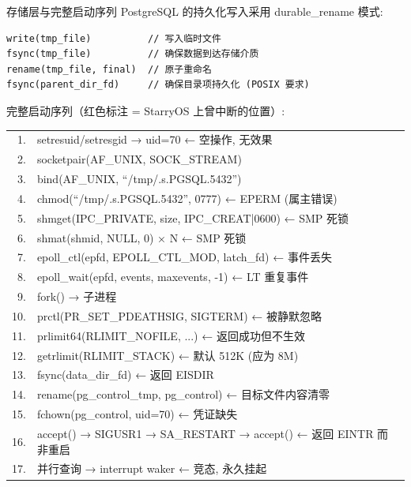 \documentclass[aspectratio=169,10pt]{ctexbeamer}
\newcommand{\highlight}[1]{\textcolor{accent}{#1}}
\newcommand{\warn}[1]{\textcolor{warn}{#1}}
\begin{document}
\begin{frame}[fragile,shrink=50]{存储层与完整启动序列}
\tiny
PostgreSQL 的持久化写入采用 \highlight{durable\_rename} 模式:

\begin{verbatim}
write(tmp_file)          // 写入临时文件
fsync(tmp_file)          // 确保数据到达存储介质
rename(tmp_file, final)  // 原子重命名
fsync(parent_dir_fd)     // 确保目录项持久化 (POSIX 要求)
\end{verbatim}

\vspace{1mm}
完整启动序列（\warn{红色标注} = StarryOS 上曾中断的位置）:

{\footnotesize
\begin{tabular}{r l}
 1. & setresuid/setresgid → uid=70
        \warn{← 空操作, 无效果} \\
 2. & socketpair(AF\_UNIX, SOCK\_STREAM) \\
 3. & bind(AF\_UNIX, ``/tmp/.s.PGSQL.5432'') \\
 4. & chmod(``/tmp/.s.PGSQL.5432'', 0777)
        \warn{← EPERM (属主错误)} \\
 5. & shmget(IPC\_PRIVATE, size, IPC\_CREAT|0600)
        \warn{← SMP 死锁} \\
 6. & shmat(shmid, NULL, 0) × N
        \warn{← SMP 死锁} \\
 7. & epoll\_ctl(epfd, EPOLL\_CTL\_MOD, latch\_fd)
        \warn{← 事件丢失} \\
 8. & epoll\_wait(epfd, events, maxevents, -1)
        \warn{← LT 重复事件} \\
 9. & fork() → 子进程 \\
10. & prctl(PR\_SET\_PDEATHSIG, SIGTERM)
        \warn{← 被静默忽略} \\
11. & prlimit64(RLIMIT\_NOFILE, ...)
        \warn{← 返回成功但不生效} \\
12. & getrlimit(RLIMIT\_STACK)
        \warn{← 默认 512K (应为 8M)} \\
13. & fsync(data\_dir\_fd)
        \warn{← 返回 EISDIR} \\
14. & rename(pg\_control\_tmp, pg\_control)
        \warn{← 目标文件内容清零} \\
15. & fchown(pg\_control, uid=70)
        \warn{← 凭证缺失} \\
16. & accept() → SIGUSR1 → SA\_RESTART → accept()
        \warn{← 返回 EINTR 而非重启} \\
17. & 并行查询 → interrupt waker
        \warn{← 竞态, 永久挂起} \\
\end{tabular}
}
\end{frame}
\end{document}
